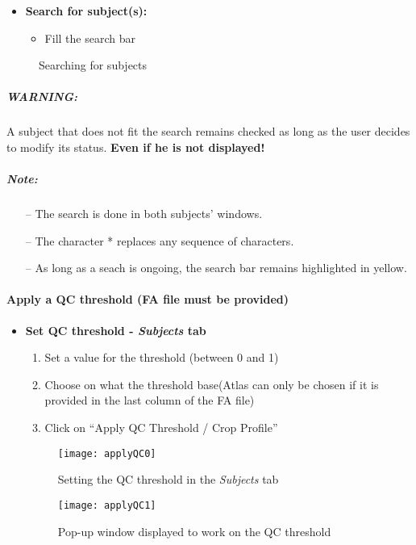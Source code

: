 \documentclass[fadttsterUserGuide_use]{subfiles}
\begin{document}
	\begin{itemize}
		\item \textbf{Search for subject(s):}
		\begin{itemize}
			\item Fill the search bar
		\end{itemize}
	\end{itemize}
	\begin{figure}[H]
    	\caption{Searching for subjects}
    	\label{fig:SearchingSubjects}
	\end{figure}
	\subparagraph{\textbf{WARNING:}} A subject that does not fit the search remains checked as long as the user decides to modify its status. \textbf{Even if he is not displayed!}
	\subparagraph{\textbf{Note:}}
	\begin{itemize}
		\item[--] The search is done in both subjects' windows.
		\item[--] The character * replaces any sequence of characters.
		\item[--] As long as a seach is ongoing, the search bar remains highlighted in yellow.
	\end{itemize}
	\vfill
	\newpage
	
	\paragraph{Apply a QC threshold (FA file must be provided)}
	\begin{itemize}
		\item \textbf{Set QC threshold - \textit{Subjects} tab}
		\begin{enumerate}
			\item Set a value for the threshold (between 0 and 1)
			\item Choose on what the threshold base\newline (Atlas can only be chosen if it is provided in the last column of the FA file)
			\item Click on ``Apply QC Threshold / Crop Profile''
		\end{enumerate}
		\begin{figure}[H]
  			\texttt{[image: applyQC0]}
  			\caption{Setting the QC threshold in the \textit{Subjects} tab}
    		\label{fig:applyQC0}
		\end{figure}	
		\begin{figure}[H]
  			\texttt{[image: applyQC1]}
  			\caption{Pop-up window displayed to work on the QC threshold}
    		\label{fig:applyQC1}
		\end{figure}	
	\end{itemize}
	\vfill
	\newpage
	
\end{document}
